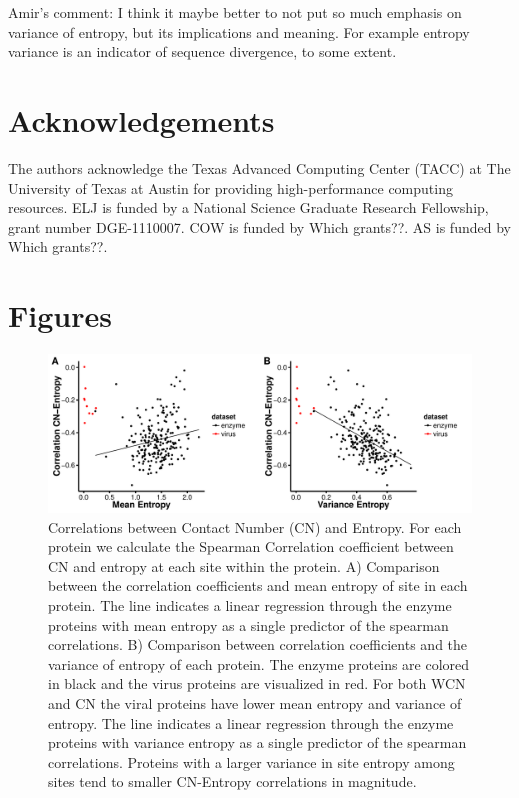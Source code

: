 \documentclass[12pt]{article}
\begin{document}
{\color{red} Amir's comment: I think it maybe better to not put so much emphasis on variance of entropy, but its implications and meaning. For example entropy variance is an indicator of sequence divergence, to some extent.}

\section{Acknowledgements}
The authors acknowledge the Texas Advanced Computing Center (TACC) at The University of Texas at Austin for providing high-performance computing resources. ELJ is funded by a National Science Graduate Research Fellowship, grant number DGE-1110007. COW is funded by {\color{red} Which grants??}.  AS is funded by {\color{red} Which grants??}.


\cleardoublepage
\section*{Figures}

    \begin{figure}[H]
            \centerline{\includegraphics[width=7.5in]{entropy_cn_cor.pdf}}     
            \caption{Correlations between Contact Number (CN) and Entropy. For each protein we calculate the Spearman Correlation coefficient between CN and entropy at each site within the protein. A) Comparison between the correlation coefficients and mean entropy of site in each protein. The line indicates a linear regression through the enzyme proteins with mean entropy as a single predictor of the spearman correlations. B) Comparison between correlation coefficients and the variance of entropy of each protein. The enzyme proteins are colored in black and the virus proteins are visualized in red. For both WCN and CN the viral proteins have lower mean entropy and variance of entropy. The line indicates a linear regression through the enzyme proteins with variance entropy as a single predictor of the spearman correlations. Proteins with a larger variance in site entropy among sites tend to smaller CN-Entropy correlations in magnitude. }
            \label{fig:entropy_cn_cor}
    \end{figure}
\end{document}
